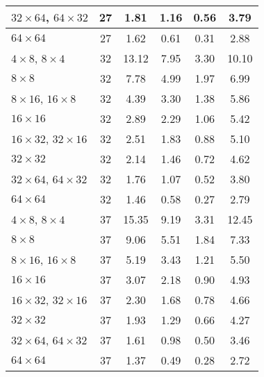 \documentclass{article}
\begin{document}
\begin{table}[htb]
\begin{tabular}{|l|c|c|c|c|c|}
\hline                                         
$32\times 64$, $64\times 32$ & 27 & 1.81 & 1.16 & 0.56 & 3.79 \\
\hline                                         
$64\times 64$ & 27 & 1.62 & 0.61 & 0.31 & 2.88 \\      
\hline \hline                                         
$4\times 8$, $8\times 4$ & 32 & 13.12 & 7.95 & 3.30 & 10.10 \\  
\hline                                         
$8\times 8$ & 32 & 7.78 & 4.99 & 1.97 & 6.99 \\        
\hline                                         
$8\times 16$, $16\times 8$ & 32 & 4.39 & 3.30 & 1.38 & 5.86 \\  
\hline                                         
$16\times 16$ & 32 & 2.89 & 2.29 & 1.06 & 5.42 \\      
\hline                                         
$16\times 32$, $32\times 16$ & 32 & 2.51 & 1.83 & 0.88 & 5.10 \\
\hline                                         
$32\times 32$ & 32 & 2.14 & 1.46 & 0.72 & 4.62 \\      
\hline                                         
$32\times 64$, $64\times 32$ & 32 & 1.76 & 1.07 & 0.52 & 3.80 \\
\hline                                         
$64\times 64$ & 32 & 1.46 & 0.58 & 0.27 & 2.79 \\      
\hline \hline                                         
$4\times 8$, $8\times 4$ & 37 & 15.35 & 9.19 & 3.31 & 12.45 \\  
\hline                                         
$8\times 8$ & 37 & 9.06 & 5.51 & 1.84 & 7.33 \\        
\hline                                         
$8\times 16$, $16\times 8$ & 37 & 5.19 & 3.43 & 1.21 & 5.50 \\  
\hline                                         
$16\times 16$ & 37 & 3.07 & 2.18 & 0.90 & 4.93 \\      
\hline                                         
$16\times 32$, $32\times 16$ & 37 & 2.30 & 1.68 & 0.78 & 4.66 \\
\hline                                         
$32\times 32$ & 37 & 1.93 & 1.29 & 0.66 & 4.27 \\      
\hline                                         
$32\times 64$, $64\times 32$ & 37 & 1.61 & 0.98 & 0.50 & 3.46 \\
\hline                                         
$64\times 64$ & 37 & 1.37 & 0.49 & 0.28 & 2.72 \\      
\hline
\end{tabular}                                            
\end{table}
\end{document}
